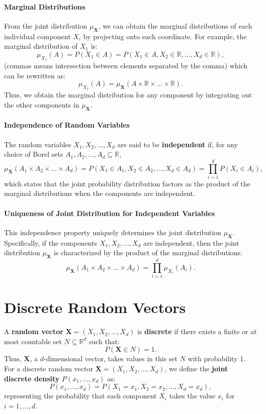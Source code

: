     \paragraph{Marginal Distributions}
    From the joint distribution \( \mu_{\mathbf{X}} \), we can obtain the marginal distributions of each individual component \( X_i \) by projecting onto each coordinate. For example, the marginal distribution of \( X_1 \) is:
    \[
    \mu_{X_1}(A) = P(X_1 \in A) = P(X_1 \in A, X_2 \in \mathbb{R}, \ldots, X_d \in \mathbb{R}),
    \]
    (commas means intersection between elements separated by the comma) which can be rewritten as:
    \[
    \mu_{X_1}(A) = \mu_{\mathbf{X}}(A \times \mathbb{R} \times \ldots \times \mathbb{R}).
    \]
    Thus, we obtain the marginal distribution for any component by integrating out the other components in \( \mu_{\mathbf{X}} \).
    
    \paragraph{Independence of Random Variables}
    The random variables \( X_1, X_2, \ldots, X_d \) are said to be \textbf{independent} if, for any choice of Borel sets \( A_1, A_2, \ldots, A_d \subseteq \mathbb{R} \),
    \[
    \mu_{\mathbf{X}}(A_1 \times A_2 \times \ldots \times A_d) = P(X_1 \in A_1, X_2 \in A_2, \ldots, X_d \in A_d) = \prod_{i=1}^d P(X_i \in A_i),
    \]
    which states that the joint probability distribution factors as the product of the marginal distributions when the components are independent.
    
    \paragraph{Uniqueness of Joint Distribution for Independent Variables}
    This independence property uniquely determines the joint distribution \( \mu_{\mathbf{X}} \). Specifically, if the components \( X_1, X_2, \ldots, X_d \) are independent, then the joint distribution \( \mu_{\mathbf{X}} \) is characterized by the product of the marginal distributions:
    \[
    \mu_{\mathbf{X}}(A_1 \times A_2 \times \ldots \times A_d) = \prod_{i=1}^d \mu_{X_i}(A_i).
    \]

\section{Discrete Random Vectors}
A \textbf{random vector} \( \mathbf{X} = (X_1, X_2, \dots, X_d) \) is \textbf{discrete} if there exists a finite or at most countable set \( N \subseteq \mathbb{R}^d \) such that:
\[
P(\mathbf{X} \in N) = 1.
\]
Thus, \( \mathbf{X} \), a \( d \)-dimensional vector, takes values in this set \( N \) with probability 1. For a discrete random vector \( \mathbf{X} = (X_1, X_2, \dots, X_d) \), we define the \textbf{joint discrete density} \( P(x_1, \dots, x_d) \) as:
\[
P(x_1, \dots, x_d) = P(X_1 = x_1, X_2 = x_2, \dots, X_d = x_d),
\]
representing the probability that each component \( X_i \) takes the value \( x_i \) for \( i = 1, \dots, d \).

